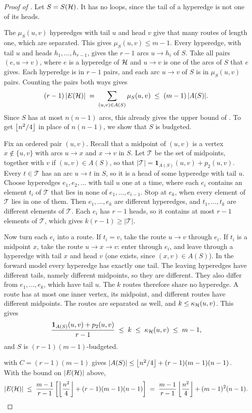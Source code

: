 \begin{proof}[Proof of ]
Let $S = S(\mathcal{H})$. It has no loops, since the tail of a hyperedge is not one of its heads.

The $\mu_S(u,v)$ hyperedges with tail $u$ and head $v$ give that many routes of length one, which are separated.
This gives $\mu_S(u,v) \le m-1$.
Every hyperedge, with tail $u$ and heads $h_1, \dots, h_{r-1}$, gives the $r-1$ arcs $u \to h_i$ of $S$.
Take all pairs $(e, u \to v)$, where $e$ is a hyperedge of $\mathcal{H}$ and $u \to v$ is one of the arcs of $S$ that $e$ gives.
Each hyperedge is in $r-1$ pairs, and each arc $u \to v$ of $S$ is in $\mu_S(u,v)$ pairs. Counting the pairs both ways gives
\[
    (r-1)\,|E(\mathcal{H})| \;=\; \sum_{(u,v) \in A(S)} \mu_S(u,v)
    \;\le\; (m-1)\,|A(S)| .
\]
Since $S$ has at most $n(n-1)$ arcs, this already gives the upper bound of . To get $\left\lfloor n^2/4 \right\rfloor$ in place of $n(n-1)$, we show that $S$ is budgeted.

Fix an ordered pair $(u,v)$.
Recall that a midpoint of $(u,v)$ is a vertex $x \notin \{u,v\}$ with arcs $u \to x$ and $x \to v$ in $S$.
Let $\mathcal{T}$ be the set of midpoints, together with $v$ if $(u,v) \in A(S)$, so that $|\mathcal{T}| = \mathbf{1}_{A(S)}(u,v) + p_2(u,v)$.
Every $t \in \mathcal{T}$ has an arc $u \to t$ in $S$, so it is a head of some hyperedge with tail $u$.
Choose hyperedges $e_1, e_2, \dots$ with tail $u$ one at a time, where each $e_i$ contains an element $t_i$ of $\mathcal{T}$ that lies in none of $e_1, \dots, e_{i-1}$.
Stop at $e_k$, when every element of $\mathcal{T}$ lies in one of them.
Then $e_1, \dots, e_k$ are different hyperedges, and $t_1, \dots, t_k$ are different elements of $\mathcal{T}$.
Each $e_i$ has $r-1$ heads, so it contains at most $r-1$ elements of $\mathcal{T}$, which gives $k(r-1) \ge |\mathcal{T}|$.

Now turn each $e_i$ into a route.
If $t_i = v$, take the route $u \to v$ through $e_i$.
If $t_i$ is a midpoint $x$, take the route $u \to x \to v$: enter through $e_i$, and leave through a hyperedge with tail $x$ and head $v$ (one exists, since $(x,v) \in A(S)$).
In the forward model every hyperedge has exactly one tail.
The leaving hyperedges have different tails, namely different midpoints, so they are different.
They also differ from $e_1, \dots, e_k$, which have tail $u$.
The $k$ routes therefore share no hyperedge.
A route has at most one inner vertex, its midpoint, and different routes have different midpoints. The routes are separated as well, and $k \le \kappa_{\mathcal{H}}(u,v)$. This gives
\[
    \frac{\mathbf{1}_{A(S)}(u,v) + p_2(u,v)}{r-1}
    \;\le\; k \;\le\; \kappa_{\mathcal{H}}(u,v) \;\le\; m-1 ,
\]
and $S$ is $(r-1)(m-1)$-budgeted.

 with $C = (r-1)(m-1)$ gives $|A(S)| \le \left\lfloor n^2/4 \right\rfloor + (r-1)(m-1)(n-1)$. With the bound on $|E(\mathcal{H})|$ above,
\[
    |E(\mathcal{H})| \;\le\; \frac{m-1}{r-1}\left[\left\lfloor \frac{n^2}{4} \right\rfloor + (r-1)(m-1)(n-1)\right]
    \;=\; \frac{m-1}{r-1}\left\lfloor \frac{n^2}{4} \right\rfloor + (m-1)^2(n-1). \qedhere
\]
\end{proof}

